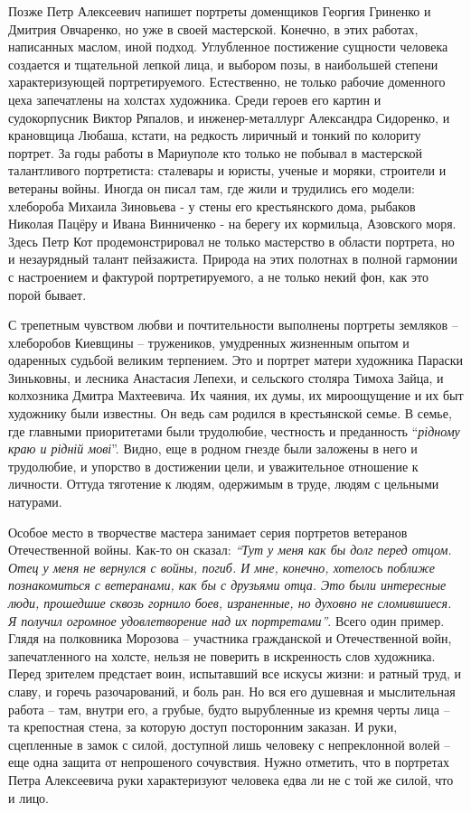 Позже Петр Алексеевич напишет портреты доменщиков Георгия Гриненко и Дмитрия
Овчаренко, но уже в своей мастерской. Конечно, в этих работах, написанных
маслом, иной подход. Углубленное постижение сущности человека создается и
тщательной лепкой лица, и выбором позы, в наибольшей степени характеризующей
портретируемого. Естественно, не только рабочие доменного цеха запечатлены на
холстах художника. Среди героев его картин и судокорпусник Виктор Ряпалов, и
инженер-металлург Александра Сидоренко, и крановщица Любаша, кстати, на
редкость лиричный и тонкий по колориту портрет. За годы работы в Мариуполе кто
только не побывал в мастерской талантливого портретиста: сталевары и юристы,
ученые и моряки, строители и ветераны войны. Иногда он писал там, где жили и
трудились его модели: хлебороба Михаила Зиновьева - у стены его крестьянского
дома, рыбаков Николая Пацёру и Ивана Винниченко - на берегу их кормильца,
Азовского моря. Здесь Петр Кот продемонстрировал не только мастерство в
области портрета, но и незаурядный талант пейзажиста. Природа на этих полотнах
в полной гармонии с настроением и фактурой портретируемого, а не только некий
фон, как это порой бывает.

С трепетным чувством любви и почтительности выполнены портреты земляков –
хлеборобов Киевщины – тружеников, умудренных жизненным опытом и одаренных
судьбой великим терпением. Это и портрет матери художника Параски Зиньковны, и
лесника Анастасия Лепехи, и сельского столяра Тимоха Зайца, и колхозника Дмитра
Махтеевича. Их чаяния, их думы, их мироощущение и их быт художнику были
известны. Он ведь сам родился в крестьянской семье. В семье, где главными
приоритетами были трудолюбие, честность и преданность \enquote{\em рідному краю и рідній
мові}. Видно, еще в родном гнезде были заложены в него и трудолюбие, и упорство
в достижении цели, и уважительное отношение к личности. Оттуда тяготение к
людям, одержимым в труде, людям с цельными натурами.

Особое место в творчестве мастера занимает серия портретов ветеранов
Отечественной войны. Как-то он сказал: \emph{\enquote{Тут у меня как бы долг перед отцом.
Отец у меня не вернулся с войны, погиб. И мне, конечно, хотелось поближе
познакомиться с ветеранами, как бы с друзьями отца. Это были интересные люди,
прошедшие сквозь горнило боев, израненные, но духовно не сломившиеся. Я получил
огромное удовлетворение над их портретами}}. Всего один пример. Глядя на
полковника Морозова – участника гражданской и Отечественной войн,
запечатленного на холсте, нельзя не поверить в искренность слов художника.
Перед зрителем предстает воин, испытавший все искусы жизни: и ратный труд, и
славу, и горечь разочарований, и боль ран. Но вся его душевная и мыслительная
работа – там, внутри его, а грубые, будто вырубленные из кремня черты лица – та
крепостная стена, за которую доступ посторонним заказан. И руки, сцепленные в
замок с силой, доступной лишь человеку с непреклонной волей – еще одна защита
от непрошеного сочувствия. Нужно отметить, что в портретах Петра Алексеевича
руки характеризуют человека едва ли не с той же силой, что и лицо.

